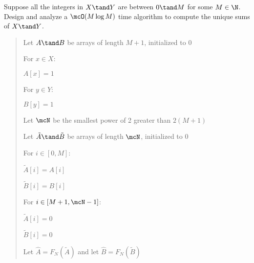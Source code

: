 \documentclass[10pt]{article}
\begin{document}
\begin{subexercise}
  \item Suppose all the integers in $ X\tand Y $ are between $ 0\tand M $ for some $ M\in \N $. Design and analyze a $ \mcO(M\log M) $ time algorithm to compute the unique sums of $ X\tand Y $.
\end{subexercise}

\begin{quote}


\begin{steps}
  \item Let $ A \tand B $ be arrays of length $ M+1 $, initialized to 0
  \item For $ x \in X $: 
  \begin{steps}
    \item $ A[x] = 1 $
  \end{steps}
  \item For $ y \in Y $: 
  \begin{steps}
    \item $ B[y] = 1 $
  \end{steps}
  \item Let $ \mcN $ be the smallest power of 2 greater than $ 2(M+1) $
  \item Let $ \tilde A \tand \tilde B $ be arrays of length $ \mcN $, initialized to 0
  \item For $ i \in [0,M] $: 
  \begin{steps}
    \item $ \tilde A[i] = A[i] $
    \item $ \tilde B[i] = B[i] $
  \end{steps}
  \item For $ i \in [M+1,\mcN-1] $: 
  \begin{steps}
    \item $ \tilde A[i] = 0 $
    \item $ \tilde B[i] = 0 $
  \end{steps}

  \item Let $ \hat A = F_N(\tilde A) $ and let $ \hat B = F_N(\tilde B) $ 


\end{steps}
\end{quote}
\end{document}
